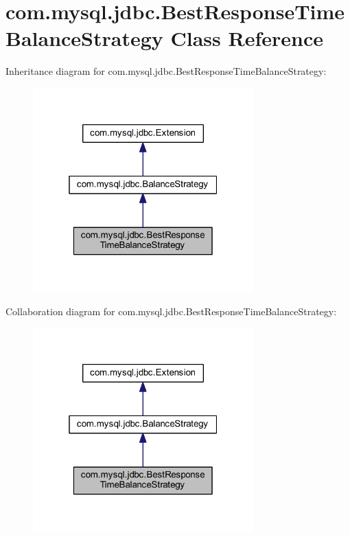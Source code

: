 \hypertarget{classcom_1_1mysql_1_1jdbc_1_1_best_response_time_balance_strategy}{}\section{com.\+mysql.\+jdbc.\+Best\+Response\+Time\+Balance\+Strategy Class Reference}
\label{classcom_1_1mysql_1_1jdbc_1_1_best_response_time_balance_strategy}


Inheritance diagram for com.\+mysql.\+jdbc.\+Best\+Response\+Time\+Balance\+Strategy\+:\nopagebreak
\begin{figure}[H]
\begin{center}
\leavevmode
\includegraphics[width=241pt]{classcom_1_1mysql_1_1jdbc_1_1_best_response_time_balance_strategy__inherit__graph}
\end{center}
\end{figure}


Collaboration diagram for com.\+mysql.\+jdbc.\+Best\+Response\+Time\+Balance\+Strategy\+:\nopagebreak
\begin{figure}[H]
\begin{center}
\leavevmode
\includegraphics[width=241pt]{classcom_1_1mysql_1_1jdbc_1_1_best_response_time_balance_strategy__coll__graph}
\end{center}
\end{figure}
